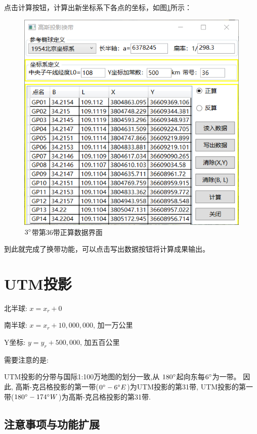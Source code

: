 点击计算按钮，计算出新坐标系下各点的坐标，如图\ref{fig:GaussProjUI06}所示：
\begin{figure}[htbp]
    \centering
    \includegraphics[scale=0.8]{gaussProj/UI06.png}
    \caption{$3^\circ$带第36带正算数据界面}
    \label{fig:GaussProjUI06}
\end{figure}

到此就完成了换带功能，可以点击写出数据按钮将计算成果输出。

\section{UTM投影}

北半球: $x = x_r + 0$

南半球: $x = x_r + 10,000,000$, 加一万公里

Y坐标: $y = y_r + 500,000$, 加五百公里

需要注意的是:

UTM投影的分带与国际1:100万地图的划分一致,从 $180^\circ$起向东每$6^\circ$为一带。
因此, 高斯-克吕格投影的第一带($0^\circ - 6^\circ E$)为UTM投影的第31带,
UTM投影的第一带($180^\circ - 174^\circ W$)为高斯-克吕格投影的第31带.

\subsection{注意事项与功能扩展}

